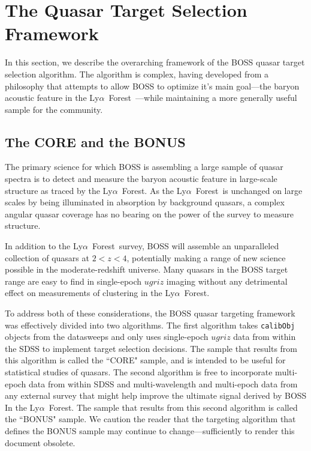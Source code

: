 \documentclass{emulateapj}
\newcommand{\Lyaf}{Ly$\alpha$~Forest~}
\newcommand{\Lyafpunc}{Ly$\alpha$~Forest}
\begin{document}
\section{The Quasar Target Selection Framework}
In this section, we describe the overarching framework of the BOSS quasar target selection algorithm. The algorithm is complex, having developed from a philosophy that attempts to allow BOSS to optimize it's main goal---the baryon acoustic feature in the \Lyaf---while maintaining a more generally useful sample for the community.

\subsection{The CORE and the BONUS}

   The primary science for which BOSS is assembling a large sample of quasar spectra is to detect and measure the baryon acoustic feature in large-scale structure as traced by the \Lyafpunc. As the \Lyaf is unchanged on large scales by being illuminated in absorption by background quasars, a complex angular quasar coverage has no bearing on the power of the survey to measure structure.
   
   In addition to the \Lyaf survey, BOSS will assemble an unparalleled collection of quasars at $2 < z < 4$, potentially making a range of new science possible in the moderate-redshift universe. Many quasars in the BOSS target range are easy to find in single-epoch $ugriz$ imaging without any detrimental effect on measurements of clustering in the \Lyafpunc.
	
   To address both of these considerations, the BOSS quasar targeting framework was effectively divided into two algorithms. The first algorithm takes {\tt calibObj} objects from the datasweeps and only uses single-epoch $ugriz$ data from within the SDSS to implement target selection decisions. The sample that results from this algorithm is called the ``CORE" sample, and is intended to be useful for statistical studies of quasars. The second algorithm is free to incorporate multi-epoch data from within SDSS and multi-wavelength and multi-epoch data from any external survey that might help improve the ultimate signal derived by BOSS In the \Lyafpunc. The sample that results from this second algorithm is called the ``BONUS" sample. We caution the reader that the targeting algorithm that defines the BONUS sample may continue to change---sufficiently to render this document obsolete.
\end{document}
